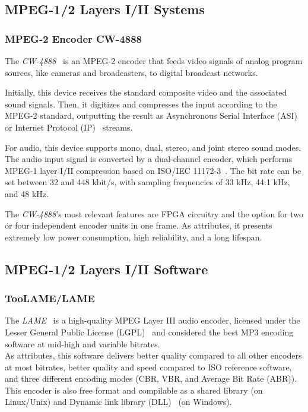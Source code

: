 \subsection{MPEG-1/2 Layers I/II Systems}

\subsubsection{MPEG-2 Encoder CW-4888}

The \textit{CW-4888}~\cite{cw4888} is an MPEG-2 encoder that feeds video signals of analog program sources, like cameras and broadcasters, to digital broadcast networks.

Initially, this device receives the standard composite video and the associated sound signals. Then, it digitizes and compresses the input according to the MPEG-2 standard, outputting the result as Asynchronous Serial Interface (ASI)~\cite{asi} or Internet Protocol (IP)~\cite{ip} streams.

For audio, this device supports mono, dual, stereo, and joint stereo sound modes. The audio input signal is converted by a dual-channel encoder, which performs MPEG-1 layer I/II compression based on ISO/IEC 11172-3~\cite{11172}. 
The bit rate can be set between 32 and 448 kbit/s, with sampling frequencies of 33 kHz, 44.1 kHz, and 48 kHz.

The \textit{CW-4888}'s most relevant features are FPGA circuitry and the option for two or four independent encoder units in one frame.
As attributes, it presents extremely low power consumption, high reliability, and a long lifespan.

\subsection{MPEG-1/2 Layers I/II Software}

\subsubsection{TooLAME/LAME}

The \textit{LAME}~\cite{lame} is a high-quality MPEG Layer III audio encoder, licensed under the Lesser General Public License (LGPL)~\cite{lgpl} and considered the best MP3 encoding software at mid-high and variable bitrates.\\
As attributes, this software delivers better quality compared to all other encoders at most bitrates, better quality and speed compared to ISO reference software, and three different encoding modes (CBR, VBR, and Average Bit Rate (ABR)). This encoder is also free format and compilable as a shared library (on Linux/Unix) and Dynamic link library (DLL)~\cite{dll} (on Windows).

